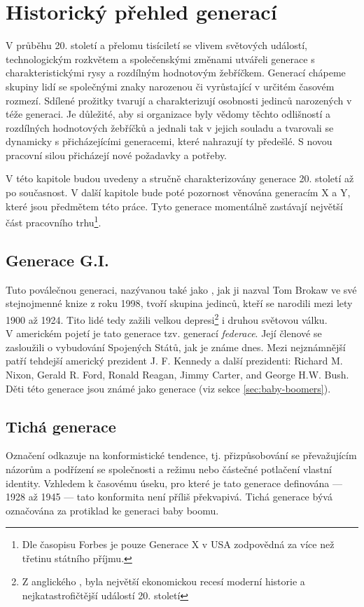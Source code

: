 \chapter{Historický přehled generací}

V průběhu 20. století a přelomu tisíciletí se vlivem světových událostí, technologickým rozkvětem a společenskými změnami utvářeli generace s charakteristickými rysy a rozdílným hodnotovým žebříčkem. Generací chápeme skupiny lidí se společnými znaky narozenou či vyrůstající v určitém časovém rozmezí. Sdílené prožitky tvarují a charakterizují osobnosti jedinců narozených v téže generaci.
Je důležité, aby si organizace byly vědomy těchto odlišností a rozdílných hodnotových žebříčků a jednali tak v jejich souladu a tvarovali se dynamicky s přicházejícími generacemi, které nahrazují ty předešlé. S novou pracovní silou přicházejí nové požadavky a potřeby.

V této kapitole budou uvedeny a stručně charakterizovány generace 20. století až po současnost. V další kapitole bude poté pozornost věnována generacím X a Y, které jsou předmětem této práce. Tyto generace momentálně zastávají největší část pracovního trhu\footnote{Dle časopisu Forbes je pouze Generace X v USA zodpovědná za více než třetinu státního příjmu.\cite{forbes2019generationX}}.

\section{Generace G.I.}
Tuto poválečnou generaci, nazývanou také jako , jak ji nazval Tom Brokaw ve své stejnojmenné knize z roku 1998\cite{cnn2013americangenerationfacts}, tvoří skupina jedinců, kteří se narodili mezi lety 1900 až 1924. Tito lidé tedy zažili velkou depresi\footnote{Z anglického \textit{}, byla největší ekonomickou recesí moderní historie a nejkatastrofičtější událostí 20. století\cite{investopedia2019thegreatdepression}} i druhou světovou válku.\\
V americkém pojetí je tato generace tzv. generací \textit{federace}. Její členové se zasloužili o vybudování Spojených Států, jak je známe dnes. Mezi nejznámnější patří tehdejší americký prezident J. F. Kennedy a další prezidenti: Richard M. Nixon, Gerald R. Ford, Ronald Reagan, Jimmy Carter, and George H.W. Bush. Děti této generace jsou známé jako generace  (viz sekce \ref{sec:baby-boomers}).

\section{Tichá generace}
Označení  odkazuje na konformistické tendence\cite{bergh2012coolznacky}, tj. přizpůsobování se převažujícím názorům a podřízení se společnosti a režimu nebo částečné potlačení vlastní identity. Vzhledem k časovému úseku, pro které je tato generace definována --- 1928 až 1945 --- tato konformita není příliš překvapivá. Tichá generace bývá označována za protiklad ke generaci baby boomu.


